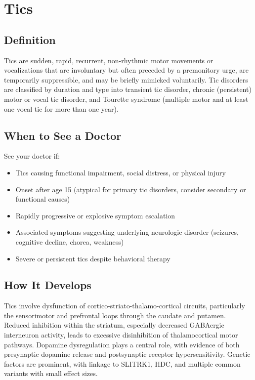\chapter{Tics}

\section*{Definition}
Tics are sudden, rapid, recurrent, non-rhythmic motor movements or vocalizations that are involuntary but often preceded by a premonitory urge, are temporarily suppressible, and may be briefly mimicked voluntarily. Tic disorders are classified by duration and type into transient tic disorder, chronic (persistent) motor or vocal tic disorder, and Tourette syndrome (multiple motor and at least one vocal tic for more than one year).

\section*{When to See a Doctor}
See your doctor if:
\begin{itemize}
  \item Tics causing functional impairment, social distress, or physical injury
  \item Onset after age 15 (atypical for primary tic disorders, consider secondary or functional causes)
  \item Rapidly progressive or explosive symptom escalation
  \item Associated symptoms suggesting underlying neurologic disorder (seizures, cognitive decline, chorea, weakness)
  \item Severe or persistent tics despite behavioral therapy
\end{itemize}

\section*{How It Develops}
Tics involve dysfunction of cortico-striato-thalamo-cortical circuits, particularly the sensorimotor and prefrontal loops through the caudate and putamen. Reduced inhibition within the striatum, especially decreased GABAergic interneuron activity, leads to excessive disinhibition of thalamocortical motor pathways. Dopamine dysregulation plays a central role, with evidence of both presynaptic dopamine release and postsynaptic receptor hypersensitivity. Genetic factors are prominent, with linkage to SLITRK1, HDC, and multiple common variants with small effect sizes.

